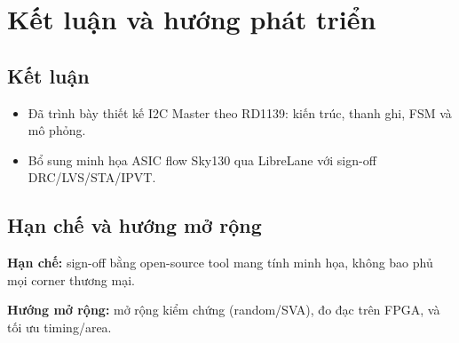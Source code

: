 \section{Kết luận và hướng phát triển}

\subsection{Kết luận}
\begin{itemize}[leftmargin=1.2cm]
    \item Đã trình bày thiết kế I2C Master theo RD1139: kiến trúc, thanh ghi, FSM và mô phỏng.
    \item Bổ sung minh họa ASIC flow Sky130 qua LibreLane với sign-off DRC/LVS/STA/IPVT.
\end{itemize}

\subsection{Hạn chế và hướng mở rộng}
\textbf{Hạn chế:} sign-off bằng open-source tool mang tính minh họa, không bao phủ mọi corner thương mại.

\textbf{Hướng mở rộng:} mở rộng kiểm chứng (random/SVA), đo đạc trên FPGA, và tối ưu timing/area.

